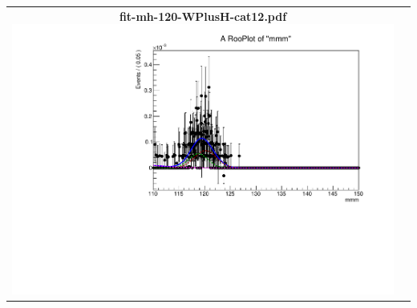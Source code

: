 \begin{longtable}{|c|c|}
{}
 \\
\hline
\parbox{0.49\textwidth}{
\centering
{\bfseries fit-mh-120-WPlusH-cat12.pdf}
\includegraphics[width=.49\textwidth]{figures/signal_model/AppendixBdt/WPlusH/120/fit_mh_120_WPlusH_cat12.pdf}
}
 & \\ \hline
\end{longtable}
